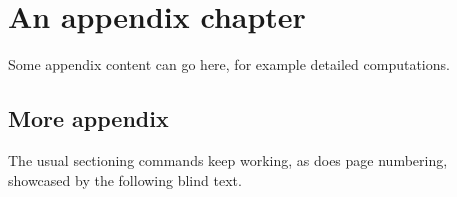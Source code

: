 
\appendix

\chapter{An appendix chapter}

Some appendix content can go here, for example detailed computations.

\section{More appendix}

The usual sectioning commands keep working, as does page numbering, showcased by the
following blind text.

\Blindtext

\backmatter

\nocite{*}%

\label{ch:bibliography}
\printbibliography[%
    category=cited,%
]


\printunsrtindex[%
    style=bookindex,%
]
